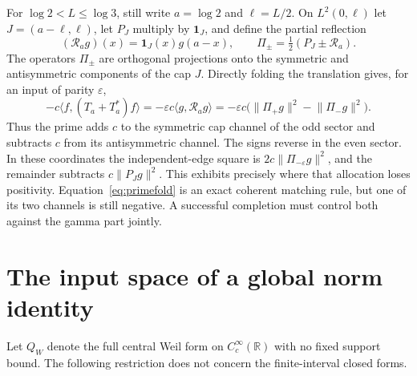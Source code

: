 \documentclass[11pt]{article}
\numberwithin{equation}{section}
\theoremstyle{definition}
\theoremstyle{remark}
\newcommand{\R}{\mathbb R}
\newcommand{\norm}[1]{\lVert#1\rVert}
\newcommand{\ip}[2]{\langle#1,#2\rangle}
\begin{document}
For $\log2<L\leq\log3$, still write $a=\log2$ and $\ell=L/2$. On
$L^2(0,\ell)$ let $J=(a-\ell,\ell)$, let $P_J$ multiply by
$\mathbf1_J$, and define the partial reflection
\begin{equation}
(\mathcal R_a g)(x)=\mathbf1_J(x)g(a-x),\qquad
\Pi_\pm=\tfrac12(P_J\pm\mathcal R_a).
\end{equation}
The operators $\Pi_\pm$ are orthogonal projections onto the symmetric
and antisymmetric components of the cap $J$. Directly folding the
translation gives, for an input of parity $\varepsilon$,
\begin{equation}
-c\ip f{(T_a+T_a^*)f}
=-\varepsilon c\ip g{\mathcal R_a g}
=-\varepsilon c\bigl(\norm{\Pi_+g}^2-\norm{\Pi_-g}^2\bigr).
\label{eq:primefold}
\end{equation}
Thus the prime adds $c$ to the symmetric cap channel of the odd sector
and subtracts $c$ from its antisymmetric channel. The signs reverse in
the even sector. In these coordinates the independent-edge square is
$2c\norm{\Pi_{-\varepsilon}g}^2$, and the remainder subtracts
$c\norm{P_Jg}^2$. This exhibits precisely where that allocation loses
positivity. Equation~\eqref{eq:primefold} is an exact coherent matching
rule, but one of its two channels is still negative. A successful
completion must control both against the gamma part jointly.

\section{The input space of a global norm identity}
\label{sec:global}

Let $Q_W$ denote the full central Weil form on $C_c^\infty(\R)$ with no
fixed support bound. The following restriction does not concern the
finite-interval closed forms.
\end{document}
